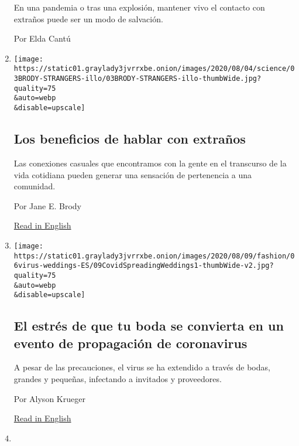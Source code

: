 \begin{enumerate}
  En una pandemia o tras una explosión, mantener vivo el contacto con
  extraños puede ser un modo de salvación.

  Por Elda Cantú
\item
  \href{/es/2020/08/07/espanol/hablar-con-desconocidos.html}{}

  \texttt{[image: https://static01.graylady3jvrrxbe.onion/images/2020/08/04/science/03BRODY-STRANGERS-illo/03BRODY-STRANGERS-illo-thumbWide.jpg?quality=75\\\&auto=webp\\\&disable=upscale]}

  \hypertarget{los-beneficios-de-hablar-con-extrauxf1os}{%
  \subsection{Los beneficios de hablar con
  extraños}\label{los-beneficios-de-hablar-con-extrauxf1os}}

  Las conexiones casuales que encontramos con la gente en el transcurso
  de la vida cotidiana pueden generar una sensación de pertenencia a una
  comunidad.

  Por Jane E. Brody

  \href{https://www.nytimes3xbfgragh.onion/2020/08/03/well/family/the-benefits-of-talking-to-strangers.html}{Read
  in English}
\item
  \href{/es/2020/08/06/espanol/estilos-de-vida/bodas-coronavirus-contagio.html}{}

  \texttt{[image: https://static01.graylady3jvrrxbe.onion/images/2020/08/09/fashion/06virus-weddings-ES/09CovidSpreadingWeddings1-thumbWide-v2.jpg?quality=75\\\&auto=webp\\\&disable=upscale]}

  \hypertarget{el-estruxe9s-de-que-tu-boda-se-convierta-en-un-evento-de-propagaciuxf3n-de-coronavirus}{%
  \subsection{El estrés de que tu boda se convierta en un evento de
  propagación de
  coronavirus}\label{el-estruxe9s-de-que-tu-boda-se-convierta-en-un-evento-de-propagaciuxf3n-de-coronavirus}}

  A pesar de las precauciones, el virus se ha extendido a través de
  bodas, grandes y pequeñas, infectando a invitados y proveedores.

  Por Alyson Krueger

  \href{https://www.nytimes3xbfgragh.onion/2020/08/04/fashion/weddings/weddings-as-covid-super-spreaders.html}{Read
  in English}
\item
  \href{/es/interactive/2020/08/06/espanol/ciencia-y-tecnologia/tengo-covid-19-sintomas.html}{}


\end{enumerate}
